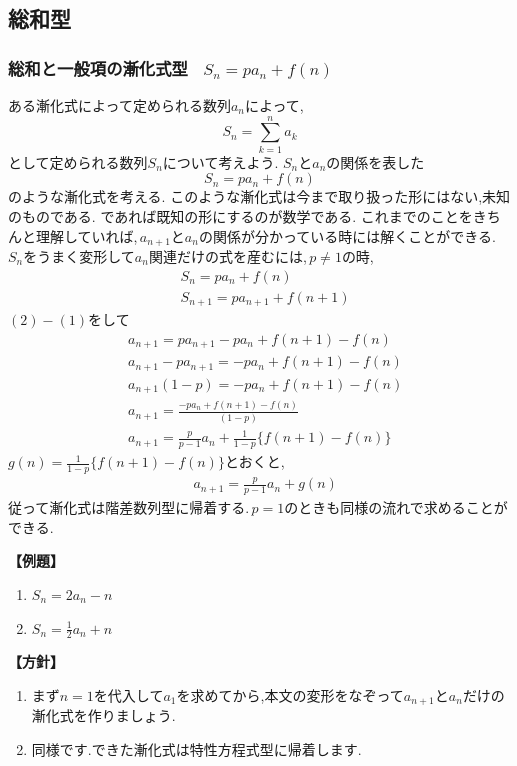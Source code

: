
\subsection{総和型}
  \subsubsection{総和と一般項の漸化式型 \, $S_n=pa_n+f(n)$}
    ある漸化式によって定められる数列$a_n$によって,
    \[
      S_n=\sum_{k=1}^{n} a_k
    \]
    として定められる数列$S_n$について考えよう.
    $S_n$と$a_n$の関係を表した
    \[
      S_n=pa_n+f(n)
    \]
    のような漸化式を考える.
    このような漸化式は今まで取り扱った形にはない,未知のものである.
    であれば既知の形にするのが数学である.
    これまでのことをきちんと理解していれば,\,$a_{n+1}$と$a_n$の関係が分かっている時には解くことができる.
    $S_n$をうまく変形して$a_{n}$関連だけの式を産むには,\,$p \neq 1$の時,
    \begin{align*}
      &S_n=pa_n+f(n) \tag*{\(\cdots\) (1)}\\
      &S_{n+1}=pa_{n+1}+f(n+1) \tag*{\(\cdots\) (2)}
    \end{align*}
    $(2)-(1)$をして
    \begin{align*}
      &a_{n+1}=pa_{n+1}-pa_n+f(n+1)-f(n)\\
      &a_{n+1}-pa_{n+1}=-pa_n+f(n+1)-f(n)\\
      &a_{n+1}(1-p)=-pa_n+f(n+1)-f(n)\\
      &a_{n+1}=\frac{-pa_n+f(n+1)-f(n)}{(1-p)}\\
      &a_{n+1}=\frac{p}{p-1}a_n+\frac{1}{1-p}\{f(n+1)-f(n)\}
    \end{align*}
    $\displaystyle g(n)=\frac{1}{1-p}\{f(n+1)-f(n)\}$とおくと,
    \begin{align*}
      &a_{n+1}=\frac{p}{p-1}a_n+g(n)
    \end{align*}
    従って漸化式は階差数列型に帰着する.\,$p=1$のときも同様の流れで求めることができる.

    \noindent \textbf{【例題】}
    \begin{enumerate}[label=(\arabic*),parsep=3pt]
      \item $\displaystyle S_n=2a_n-n$
      \item $\displaystyle S_n=\frac12a_n+n$
    \end{enumerate}

    \noindent\textbf{【方針】}
    \begin{enumerate}[label=(\arabic*),parsep=3pt]
      \item まず$n=1$を代入して$a_1$を求めてから,本文の変形をなぞって$a_{n+1}$と$a_n$だけの漸化式を作りましょう.
      \item 同様です.できた漸化式は特性方程式型に帰着します.
    \end{enumerate}

